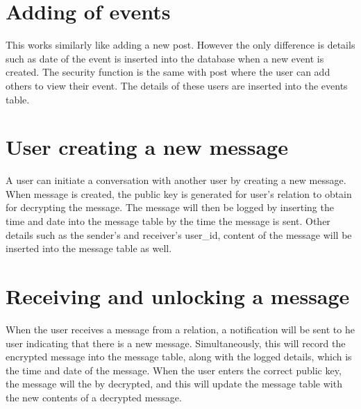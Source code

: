 \section{Adding of events}
This works similarly like adding a new post. However the only difference is
details such as date of the event is inserted into the database when a new event
is created. The security function is the same with post where the user can add
others to view their event. The details of these users are inserted into the
events table. 

\section{User creating a new message}
A user can initiate a conversation with another user by creating a new message.
When message is created, the public key is generated for user's relation to
obtain for decrypting the message. The message will then be logged by inserting
the time and date into the message table by the time the message is sent. Other
details such as the sender's and receiver's user\_id, content of the message
will be inserted into the message table as well. 

\section{Receiving and unlocking a message}
When the user receives a message from a relation, a notification will be sent to 
he user indicating that there is a new message. Simultaneously, this will record
the encrypted message into the message table, along with the logged details,
which is the time and date of the message. When the user enters the correct
public key, the message will the by decrypted, and this will update the message
table with the new contents of a decrypted message. 
